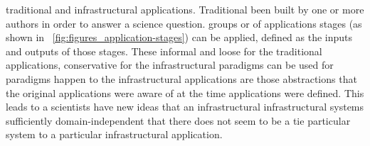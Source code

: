 \documentclass[times]{cpeauth}
\begin{document}

traditional and infrastructural applications.  Traditional %
been built by one or more authors in order to %
answer a science question.  %
groups or %
of applications stages (as shown in %
\figurename~\ref{fig:figures_application-stages}) can be applied, %
defined as the inputs and outputs of those stages.  These %
informal and loose for the traditional applications, %
conservative for the infrastructural %
paradigms can be used for %
paradigms happen to %
the %
infrastructural applications are those abstractions that the %
original applications were aware of at the time %
applications were defined.  This leads to a %
scientists have new ideas that %
an infrastructural %
infrastructural %
systems %
sufficiently domain-independent that there does not seem to be a tie %
particular system to a particular infrastructural application.
\end{document}
